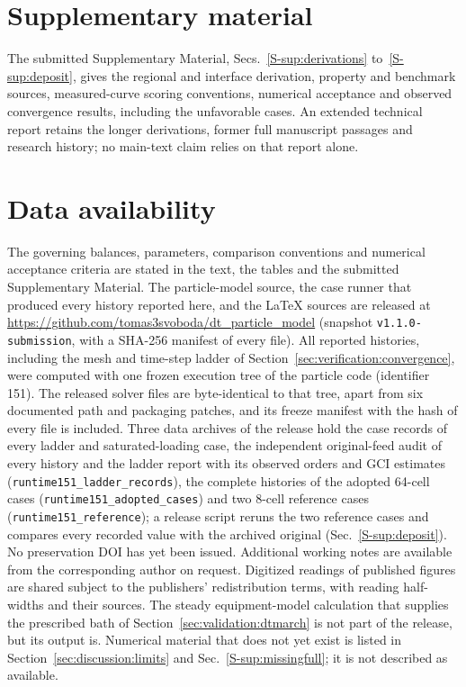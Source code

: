 \documentclass[11pt]{article}
\begin{document}
\section*{Supplementary material}
The submitted Supplementary Material, Secs.~\ref*{S-sup:derivations}
to~\ref*{S-sup:deposit}, gives the regional and interface derivation,
property and benchmark sources, measured-curve scoring conventions,
numerical acceptance and observed convergence results, including the
unfavorable cases. An extended technical report retains
the longer derivations, former full manuscript passages and research
history; no main-text claim relies on that report alone.

\section*{Data availability}
The governing balances, parameters, comparison conventions and numerical
acceptance criteria are stated in the text, the tables and the submitted
Supplementary Material. The particle-model source, the case runner that
produced every history reported here, and the LaTeX sources are released at
\url{https://github.com/tomas3svoboda/dt_particle_model}
(snapshot \texttt{v1.1.0-submission}, with a SHA-256 manifest of every file).
All reported histories, including the mesh and time-step ladder of
Section~\ref{sec:verification:convergence}, were computed with one frozen
execution tree of the particle code (identifier 151). The released solver
files are byte-identical to that tree, apart from six documented path and
packaging patches, and its freeze manifest with the hash of every file is
included. Three data archives of the release hold the case records of
every ladder and saturated-loading case, the independent original-feed
audit of every history and the ladder report with its observed orders and
GCI estimates (\texttt{runtime151\_ladder\_records}), the complete histories
of the adopted 64-cell cases (\texttt{runtime151\_adopted\_cases}) and two
8-cell reference cases (\texttt{runtime151\_reference}); a release script reruns
the two reference cases and compares every recorded value with the
archived original (Sec.~\ref*{S-sup:deposit}). No preservation DOI has
yet been issued. Additional working notes are available from the
corresponding author on request.
Digitized readings of published figures are shared subject to the
publishers' redistribution terms, with reading half-widths and their sources.
The steady equipment-model calculation that supplies the prescribed bath
of Section~\ref{sec:validation:dtmarch} is not part of the release, but
its output is. Numerical material that does not yet exist is listed in
Section~\ref{sec:discussion:limits} and Sec.~\ref*{S-sup:missingfull};
it is not described as available.
\end{document}
